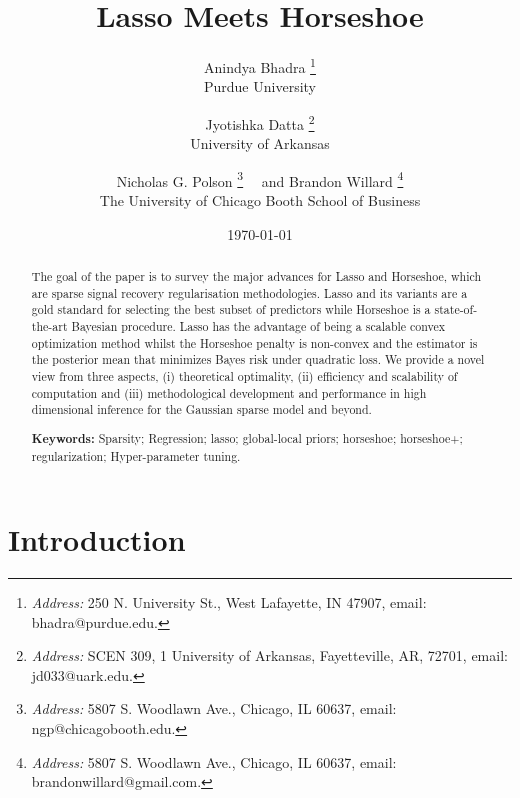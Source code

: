 \documentclass[11pt]{article}
\title{Lasso Meets Horseshoe}
\author{Anindya Bhadra  \footnote{{\em Address:} 250 N. University St., West Lafayette, IN 47907, email: bhadra@purdue.edu.} \\Purdue University
\and Jyotishka Datta  \footnote{{\em Address:} SCEN 309, 1 University of Arkansas, Fayetteville, AR, 72701, email: jd033@uark.edu.}\\ University of Arkansas\\
\and Nicholas G. Polson \footnote{{\em Address:} 5807 S. Woodlawn Ave., Chicago, IL 60637, email: ngp@chicagobooth.edu.}  \ \ and Brandon Willard \footnote{{\em Address:} 5807 S. Woodlawn Ave., Chicago, IL 60637, email: brandonwillard@gmail.com.} \\The University of Chicago Booth School of
Business}
\date{\today}
\numberwithin{equation}{section}
\begin{document}
\maketitle
\onehalfspacing


\begin{abstract}
\baselineskip=15pt
\noindent %
The goal of the paper is to survey the major advances for Lasso and Horseshoe, which are sparse signal recovery regularisation methodologies. Lasso and its variants are a gold standard for selecting the best subset of predictors while Horseshoe is a state-of-the-art Bayesian procedure. Lasso has the advantage of being a scalable convex optimization method whilst the Horseshoe penalty is non-convex and the estimator is the posterior mean that minimizes Bayes risk under quadratic loss.  We provide a novel view from three aspects, (i) theoretical optimality, (ii) efficiency and scalability of computation and (iii) methodological development and performance in high dimensional inference for the Gaussian sparse model and beyond. 


{\bf Keywords:} Sparsity; Regression; lasso; global-local priors; horseshoe; horseshoe+; regularization; Hyper-parameter tuning. 
\end{abstract}

\section{Introduction}


\end{document}
